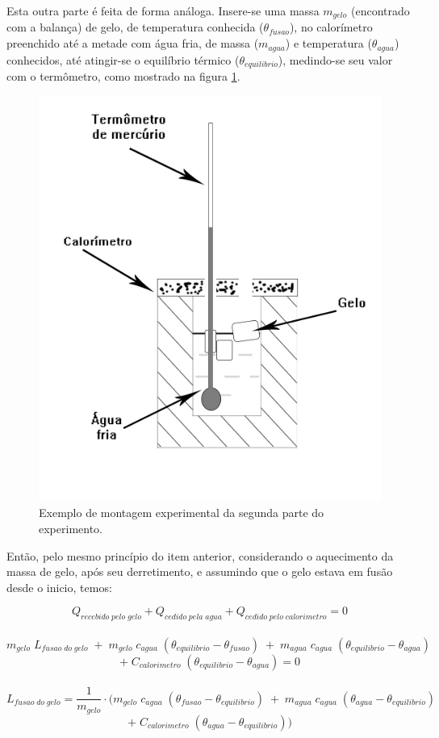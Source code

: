 \documentclass[12pt,a4paper]{article}
\begin{document}
Esta outra parte é feita de forma análoga. Insere-se uma massa $m_{gelo}$ (encontrado com a balança) de gelo, de temperatura conhecida ($\theta_{fusao}$), no calorímetro preenchido até a metade com água fria, de massa ($m_{agua}$) e temperatura ($\theta_{agua}$) conhecidos, até atingir-se o equilíbrio térmico ($\theta_{equilibrio}$), medindo-se seu valor com o termômetro, como mostrado na figura \ref{CalorGelo}.

\begin{figure}[!htbp]
\centering
\includegraphics[scale=0.45]{Fig6b2.jpg}
\caption{Exemplo de montagem experimental da segunda parte do experimento.}
\label{CalorGelo}
\end{figure}

Então, pelo mesmo princípio do item anterior, considerando o aquecimento da massa de gelo, após seu derretimento, e assumindo que o gelo estava em fusão desde o inicio, temos:

$$Q_{recebido\;pelo\;gelo} + Q_{cedido\;pela\;agua} + Q_{cedido\;pelo\;calorimetro} = 0$$\
$$m_{gelo} \; L_{fusao\;do\;gelo} \; + \; m_{gelo} \; c_{agua} \; (\theta_{equilibrio} - \theta_{fusao}) \; + \; m_{agua} \; c_{agua} \; (\theta_{equilibrio} - \theta_{agua}) \;$$ $$+ \; C_{calorimetro} \; (\theta_{equilibrio} - \theta_{agua}) = 0$$\
$$L_{fusao\;do\;gelo} = \frac{1}{m_{gelo}} \cdot (m_{gelo} \; c_{agua} \; (\theta_{fusao} - \theta_{equilibrio}) \; + \; m_{agua} \; c_{agua} \; (\theta_{agua} - \theta_{equilibrio}) \;$$ 
$$ + \; C_{calorimetro} \; (\theta_{agua} - \theta_{equilibrio}))$$
\end{document}
